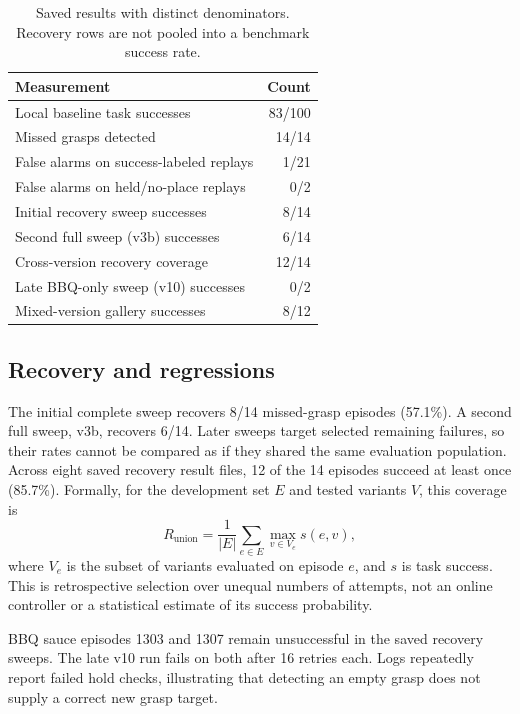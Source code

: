 \documentclass[10pt,twocolumn]{article}
\begin{document}
\begin{table}[t]
\centering\small
\caption{Saved results with distinct denominators. Recovery rows are not pooled into a benchmark success rate.}
\label{tab:results}
\begin{tabular}{@{}p{}r@{}}
\toprule
Measurement & Count\\
\midrule
Local baseline task successes & 83/100\\
Missed grasps detected & 14/14\\
False alarms on success-labeled replays & 1/21\\
False alarms on held/no-place replays & 0/2\\
Initial recovery sweep successes & 8/14\\
Second full sweep (v3b) successes & 6/14\\
Cross-version recovery coverage & 12/14\\
Late BBQ-only sweep (v10) successes & 0/2\\
Mixed-version gallery successes & 8/12\\
\bottomrule
\end{tabular}
\end{table}

\subsection{Recovery and regressions}
The initial complete sweep recovers 8/14 missed-grasp episodes (57.1\%). A second full sweep, v3b, recovers 6/14. Later sweeps target selected remaining failures, so their rates cannot be compared as if they shared the same evaluation population. Across eight saved recovery result files, 12 of the 14 episodes succeed at least once (85.7\%). Formally, for the development set $E$ and tested variants $V$, this coverage is
\begin{equation}
 R_{\mathrm{union}}=\frac{1}{|E|}\sum_{e\in E}\max_{v\in V_e} s(e,v),
\end{equation}
where $V_e$ is the subset of variants evaluated on episode $e$, and $s$ is task success. This is retrospective selection over unequal numbers of attempts, not an online controller or a statistical estimate of its success probability.

BBQ sauce episodes 1303 and 1307 remain unsuccessful in the saved recovery sweeps. The late v10 run fails on both after 16 retries each. Logs repeatedly report failed hold checks, illustrating that detecting an empty grasp does not supply a correct new grasp target.
\end{document}
